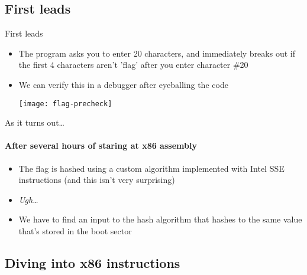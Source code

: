 \subsection{First leads}

\begin{frame}{First leads}
    \begin{itemize}
        \item<1-> The program asks you to enter 20 characters, and immediately
                  breaks out if the first 4 characters aren't 'flag' after you
                  enter character \#20
        \item<2-> We can verify this in a debugger after eyeballing the code

        \begin{center}
             {\texttt{[image: flag-precheck]}}
        \end{center}
    \end{itemize}
\end{frame}

\begin{frame}{As it turns out\ldots}
    \framesubtitle{After several hours of staring at x86 assembly}

    \begin{itemize}
        \item<1-> The flag is \alert{hashed} using a \alert{custom algorithm}
                  implemented with Intel SSE instructions (and this isn't very
                  surprising)
        \item<2-> {\em Ugh\ldots}
        \item<3-> We have to find an input to the hash algorithm that hashes
                  to the same value that's stored in the boot sector
    \end{itemize}
\end{frame}

\subsection{Diving into x86 instructions}

